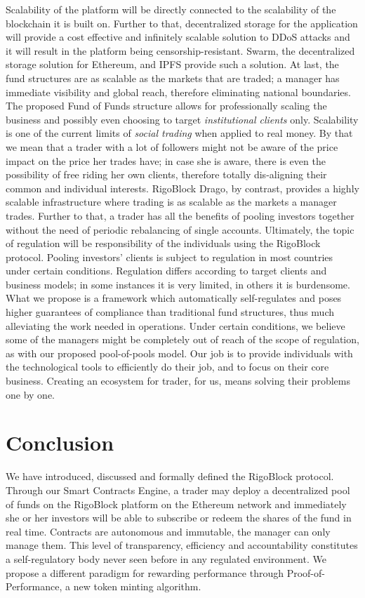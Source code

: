 \documentclass[9pt,oneside]{amsart}
\begin{document}
\begin{multicols}{2}
Scalability of the platform will be directly connected to the scalability of the blockchain it is built on. Further to that, decentralized storage for the application will provide a cost effective and infinitely scalable solution to DDoS attacks and it will result in the platform being censorship-resistant.
Swarm, the decentralized storage solution for Ethereum, and IPFS provide such a solution.
At last, the fund structures are as scalable as the markets that are traded; a manager has immediate visibility and global reach, therefore eliminating national boundaries. The proposed Fund of Funds structure allows for professionally scaling the business and possibly even choosing to target \textit{institutional clients} only.
Scalability is one of the current limits of \textit{social trading} when applied to real money. By that we mean that a trader with a lot of followers might not be aware of the price impact on the price her trades have; in case she is aware, there is even the possibility of free riding her own clients, therefore totally dis-aligning their common and individual interests. RigoBlock Drago, by contrast, provides a highly scalable infrastructure where trading is as scalable as the markets a manager trades. Further to that, a trader has all the benefits of pooling investors together without the need of periodic rebalancing of single accounts.
Ultimately, the topic of regulation will be responsibility of the individuals using the RigoBlock protocol. Pooling investors' clients is subject to regulation in most countries under certain conditions. Regulation differs according to target clients and business models; in some instances it is very limited, in others it is burdensome. What we propose is a framework which automatically self-regulates and poses higher guarantees of compliance than traditional fund structures, thus much alleviating the work needed in operations. Under certain conditions, we believe some of the managers might be completely out of reach of the scope of regulation, as with our proposed pool-of-pools model. Our job is to provide individuals with the technological tools to efficiently do their job, and to focus on their core business. Creating an ecosystem for trader, for us, means solving their problems one by one.

\section{Conclusion} \label{ch:conclusion}

We have introduced, discussed and formally defined the RigoBlock protocol. Through our Smart Contracts Engine, a trader may deploy a decentralized pool of funds on the RigoBlock platform on the Ethereum network and immediately she or her investors will be able to subscribe or redeem the shares of the fund in real time. Contracts are autonomous and immutable, the manager can only manage them. This level of transparency, efficiency and accountability constitutes a self-regulatory body never seen before in any regulated environment. We propose a different paradigm for rewarding performance through Proof-of-Performance, a new token minting algorithm.


\end{multicols}
\end{document}
